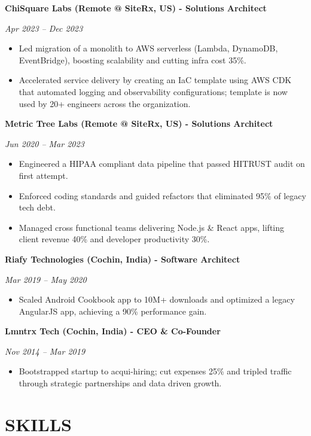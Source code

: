 \documentclass[11pt]{article}
\begin{document}
\textbf{ChiSquare Labs (Remote @ SiteRx, US) - Solutions Architect}

\textit{Apr 2023 -- Dec 2023}

\begin{itemize}
\item Led migration of a monolith to AWS serverless (Lambda, DynamoDB, EventBridge), boosting scalability and cutting infra cost 35\%.
\item Accelerated service delivery by creating an IaC template using AWS CDK that automated logging and observability configurations; template is now used by 20+ engineers across the organization.
\end{itemize}

\textbf{Metric Tree Labs (Remote @ SiteRx, US) - Solutions Architect}

\textit{Jun 2020 -- Mar 2023}

\begin{itemize}
\item Engineered a HIPAA compliant data pipeline that passed HITRUST audit on first attempt.
\item Enforced coding standards and guided refactors that eliminated 95\% of legacy tech debt.
\item Managed cross functional teams delivering Node.js \& React apps, lifting client revenue 40\% and developer productivity 30\%.
\end{itemize}

\textbf{Riafy Technologies (Cochin, India) - Software Architect}

\textit{Mar 2019 -- May 2020}

\begin{itemize}
\item Scaled Android Cookbook app to 10M+ downloads and optimized a legacy AngularJS app, achieving a 90\% performance gain.
\end{itemize}

\textbf{Lmntrx Tech (Cochin, India) - CEO \& Co-Founder}

\textit{Nov 2014 -- Mar 2019}

\begin{itemize}
\item Bootstrapped startup to acqui-hiring; cut expenses 25\% and tripled traffic through strategic partnerships and data driven growth.
\end{itemize}

\section*{SKILLS}
\end{document}
